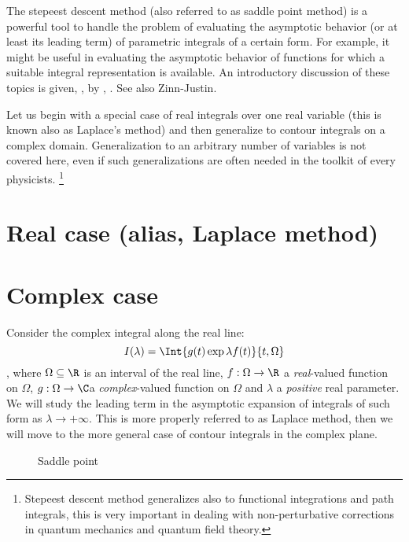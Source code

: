 


The 
stepeest descent method (also referred to as saddle point method) is a powerful tool to handle the problem of
evaluating  the
  asymptotic behavior (or at least its leading term) of parametric integrals of a certain form.
For example, it might be useful in evaluating the asymptotic behavior of functions
 for which a suitable integral representation is available.
An introductory discussion of these topics is given, \eg, by
\cite[\S~11]{king}, \cite[\S6]{ablowitz}. See also Zinn-Justin.
\par
Let us begin with a special case of real integrals over one real variable (this
is known also as Laplace's method) and then generalize to contour integrals on
a  complex domain. Generalization to an arbitrary number of variables is not
covered here, even if such generalizations are often needed in the toolkit of
every physicists.%
\footnote{Stepeest  descent method  generalizes also to
functional
integrations and path integrals, this is very important in dealing with
non-perturbative corrections in quantum mechanics and quantum field
theory.}
\section{Real case (alias, Laplace method)}
\section{Complex case}
Consider the complex integral  along the real line:
\begin{dmath}
   I(\lambda) = \Int{ g(t)  \exp{ \lambda f(t)}}{t,\Omega} 
\end{dmath},
where $\Omega\subseteq \R$ is an interval of the real line,
$f:\Omega\rightarrow\R$ a \emph{real}-valued function on $\Omega$,
$g:\Omega\rightarrow\C$a  \emph{complex}-valued function on $\Omega$ and
$\lambda$ a \emph{positive} real parameter.
We will study the leading term in the asymptotic expansion of integrals of such
form as $\lambda \rightarrow+\infty$. This is more properly referred to as
Laplace method, then we will move to the more general case of contour integrals
in the complex plane.
\par
\begin{figure}
   \centering
\caption{Saddle point}
\end{figure}





